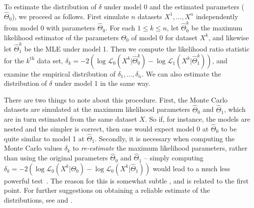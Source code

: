 To estimate the distribution of $\delta$ under model 0 and the estimated parameters ($\hat \Theta_0$), we proceed as follows.
First simulate $n$ datasets $X^1, \ldots, X^n$ independently from model 0 with parameters $\hat \Theta_0$.  
For each $1 \le k \le n$, let $\hat \Theta_0^k$ be the maximum likelihood estimator of the parameters $\Theta_0$ of model 0 for dataset $X^k$, 
and likewise let $\hat \Theta_1^k$ be the MLE under model 1.
Then we compute the likelihood ratio statistic for the $k^{\text{th}}$ data set, $\delta_k = - 2 ( \log \mathcal{L}_0( X^k | \hat \Theta^k_0 ) - \log \mathcal{L}_1( X^k | \hat \Theta^k_1 ) )$,
and examine the empirical distribution of $\delta_1, \ldots, \delta_n$.
We can also estimate the distribution of $\delta$ under model 1 in the same way.

There are two things to note about this procedure. 
First, the Monte Carlo datasets are simulated at the maximum likelihood parameters $\hat \Theta_0$ and $\hat \Theta_1$, 
which are in turn estimated from the same dataset $X$.  
So if, for instance, the models are nested and the simpler is correct, 
then one would expect model 0 at $\hat \Theta_0$ to be quite similar to model 1 at $\hat \Theta_1$.
Secondly, it is necessary when computing the Monte Carlo values $\delta_k$ to {\em re-estimate} the maximum likelihood parameters,
rather than using the original parameters $\hat \Theta_0$ and $\hat \Theta_1$ --
simply computing $\delta_k = - 2 ( \log \mathcal{L}_0(X^k | \hat \Theta_0 ) - \log \mathcal{L}_0(X^k | \hat \Theta_1 ) )$
would lead to a much less powerful test~\citep{Hall1991a}.
The reason for this is somewhat subtle \citep[see][]{McLachlan1987}, and is related to the first point.  
For further suggestions on obtaining a reliable estimate of the distributions, 
see \citet{Efron1987} and \citet{Diciccio1996}.  


